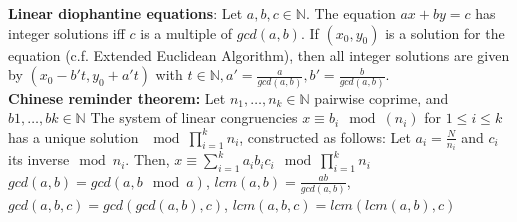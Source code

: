 \textbf{Linear diophantine equations}: Let $a,b,c \in \mathbb{N}$. 
The equation $ax+by=c$ has integer solutions iff $c$ is a multiple of $gcd(a,b)$.
If $(x_0,y_0)$ is a solution for the equation (c.f. Extended Euclidean Algorithm), 
then all integer solutions are given by $(x_0-b't, y_0+a't)$ with $t \in \mathbb{N}, 
a'= \frac{a}{gcd(a,b)}, b'=\frac{b}{gcd(a,b)}$.\\

\textbf{Chinese reminder theorem:} Let $n_1,\ldots,n_k \in \mathbb{N}$ pairwise coprime,
and $b1,\ldots,bk \in \mathbb{N}$ The system of linear congruencies $x \equiv b_i \mod (n_i)$
for $1\leq i \leq k$ has a unique solution $\mod \prod_{i=1}^k n_i$, constructed as follows:
Let $a_i = \frac{N}{n_i}$ and $c_i$ its inverse$\mod n_i$. Then, $x\equiv\sum_{i=1}^{k} a_i b_i c_i \mod \prod_{i=1}^k n_i$\\

$gcd(a,b) = gcd(a,b \mod a)$, $lcm(a,b) = \frac{ab}{gcd(a,b)}$, $gcd(a,b,c) = gcd(gcd(a,b), c)$, $lcm(a,b,c) = lcm(lcm(a,b),c)$
